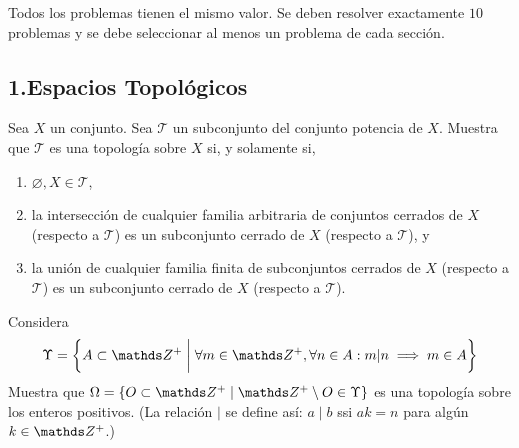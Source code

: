\documentclass[b5paper,10pt,twoside]{book}
\begin{document}
\def\thetitle{Examen final}
\def\fechaentrega{31 de enero de 2025}


Todos los problemas tienen el mismo valor.
Se deben resolver exactamente \(10\) problemas
y se debe seleccionar  al menos un problema de cada sección.



\subsection*{1.\enspace Espacios Topológicos}

\begin{problem}
Sea \(X\) un conjunto.
Sea \(\mathcal{T}\) un subconjunto del conjunto potencia de \(X\).
Muestra que \(\mathcal{T}\) es una topología sobre \(X\) si, y solamente si,
\begin{enumerate}[label=(\roman*)]
\item \(\varnothing, X\in \mathcal{T}\),
\item la intersección de cualquier familia arbitraria de conjuntos cerrados de \(X\) (respecto a \(\mathcal{T}\)) es un subconjunto cerrado de \(X\) (respecto a \(\mathcal{T}\)), y 
\item la unión de cualquier familia finita de subconjuntos cerrados de \(X\) (respecto a \(\mathcal{T}\)) es un subconjunto cerrado de \(X\) (respecto a \(\mathcal{T}\)).
\end{enumerate}
\end{problem}


\begin{problem}
Considera 
\[
\Upsilon  = \left\{ 
    A\subset \Z^+ \;\bigg|\; \forall m \in \Z^+, \forall n \in A :  m|n \implies m \in A
 \right\}
\]
Muestra que \( \Omega = \left\{ O \subset \Z^+ \mid \Z^+\setminus O \in \Upsilon \right\}  \) es una topología sobre los enteros positivos.
(La relación \(\mid\) se define así:  \(a\mid b\) ssi \(ak = n\) para algún   \(k\in \Z^+\).)
\end{problem}
\end{document}
